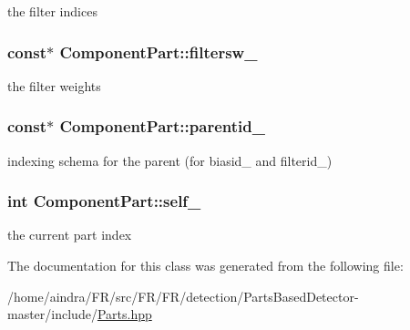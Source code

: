the filter indices 

\hypertarget{classComponentPart_a301c8633b1e8db3f30436c0ba0fc140d}{
\subsubsection[{filtersw\-\_\-}]{ const$\ast$ {\bf \-Component\-Part\-::filtersw\-\_\-}}}\label{classComponentPart_a301c8633b1e8db3f30436c0ba0fc140d}


the filter weights 

\hypertarget{classComponentPart_a3c75a843f04e4b3d56e4461f8ef803fa}{
\subsubsection[{parentid\-\_\-}]{ const$\ast$ {\bf \-Component\-Part\-::parentid\-\_\-}}}\label{classComponentPart_a3c75a843f04e4b3d56e4461f8ef803fa}


indexing schema for the parent (for biasid\-\_\- and filterid\-\_\-) 

\hypertarget{classComponentPart_a814391cfc1e60223f270d06e3bf2f8b6}{
\subsubsection[{self\-\_\-}]{\setlength{\rightskip}{0pt plus 5cm}int {\bf \-Component\-Part\-::self\-\_\-}}}\label{classComponentPart_a814391cfc1e60223f270d06e3bf2f8b6}


the current part index 



\-The documentation for this class was generated from the following file\-:\begin{DoxyCompactItemize}
\item 
/home/aindra/\-F\-R/src/\-F\-R/\-F\-R/detection/\-Parts\-Based\-Detector-\/master/include/\hyperlink{Parts_8hpp}{\-Parts.\-hpp}\end{DoxyCompactItemize}
